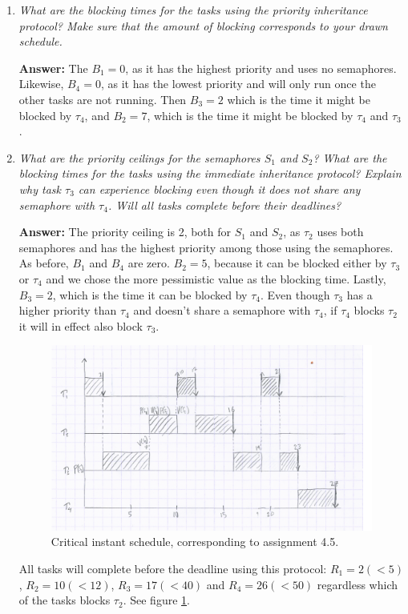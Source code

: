 \documentclass[a4paper,10pt]{article}
\newcommand{\answer}{\textbf{Answer: }}
\begin{document}
\begin{enumerate}
	\item \emph{What are the blocking times for the tasks using the priority inheritance protocol? Make sure that the amount of blocking corresponds to your drawn schedule.}
	
	\answer The $B_1 = 0$, as it has the highest priority and uses no semaphores. Likewise, $B_4 = 0$, as it has the lowest priority and will only run once the other tasks are not running. Then $B_3 = 2$ which is the time it might be blocked by $\tau_4$, and $B_2 = 7$, which is the time it might be blocked by $\tau_4$ and $\tau_3$.
	
	\item \emph{What are the priority ceilings for the semaphores $S_1$ and $S_2$? What are the blocking times for the tasks using the immediate inheritance protocol? Explain why task $\tau_3$ can experience blocking even though it does not share any semaphore with $\tau_4$. Will all tasks complete before their deadlines?}
	
	\answer The priority ceiling is 2, both for $S_1$ and $S_2$, as $\tau_2$ uses both semaphores and has the highest priority among those using the semaphores. As before, $B_1$ and $B_4$ are zero. $B_2 = 5$, because it can be blocked either by $\tau_3$ or $\tau_4$ and we chose the more pessimistic value as the blocking time. Lastly, $B_3 = 2$, which is the time it can be blocked by $\tau_4$. Even though $\tau_3$ has a higher priority than $\tau_4$ and doesn't share a semaphore with $\tau_4$, if $\tau_4$ blocks $\tau_2$ it will in effect also block $\tau_3$.
	
	\begin{figure}
	\includegraphics[scale=0.4]{3_5_low}
	\caption{Critical instant schedule, corresponding to assignment 4.5.}
	\label{4_5}
	\end{figure}

	All tasks will complete before the deadline using this protocol: $R_1 = 2 (<5)$, $R_2 = 10 (<12)$, $R_3 = 17 (<40)$ and $R_4 = 26 (<50)$ regardless which of the tasks blocks $\tau_2$. See figure \ref{4_5}.
\end{enumerate}
\end{document}

